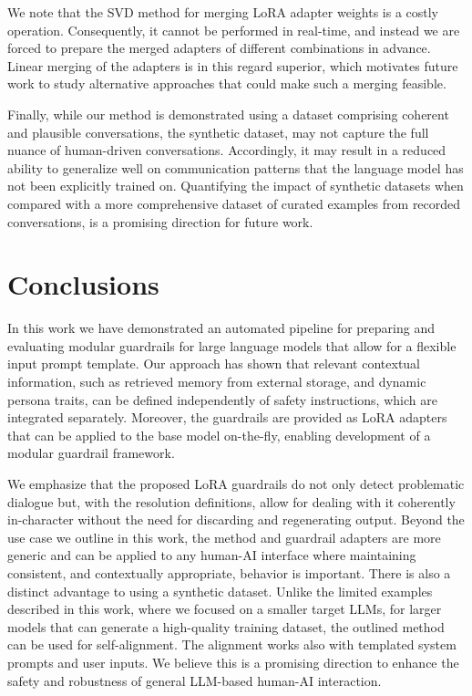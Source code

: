 \documentclass[letterpaper]{article}
\begin{document}
We note that the SVD method for merging LoRA adapter weights is a costly operation. Consequently, it cannot be performed in real-time, and instead we are forced to prepare the merged adapters of different combinations in advance. Linear merging of the adapters is in this regard superior, which motivates future work to study alternative approaches that could make such a merging feasible. 

Finally, while our method is demonstrated using a dataset comprising coherent and plausible conversations, 
the synthetic dataset, may not capture the full nuance of human-driven conversations. Accordingly, it may result in a reduced ability to generalize well on communication patterns that the language model has not been explicitly trained on. 
Quantifying the impact of synthetic datasets when compared with a more comprehensive dataset of curated examples from recorded conversations, is a promising direction for future work. 

\section{Conclusions}
In this work we have demonstrated an automated pipeline for preparing and evaluating modular guardrails for large language models that allow for a flexible input prompt template. Our approach has shown that relevant contextual information, such as retrieved memory from external storage, and dynamic persona traits, can be defined independently of safety instructions, which are integrated separately.
Moreover, the guardrails are provided as LoRA adapters that can be applied to the base model on-the-fly, enabling development of a modular guardrail framework.

We emphasize that the proposed LoRA guardrails do not only detect problematic dialogue but, with the resolution definitions, allow for dealing with it coherently in-character without the need for discarding and regenerating output.
Beyond the use case we outline in this work, the method and guardrail adapters are more generic and can be applied to any human-AI interface where maintaining consistent, and contextually appropriate, behavior is important.  
There is also a distinct advantage to using a synthetic dataset. Unlike the limited examples described in this work, where we focused on a smaller target LLMs, for larger models that can generate a high-quality training dataset, the outlined method can be used for self-alignment. 
The alignment works also with templated system prompts and user inputs. We believe this is a promising direction to enhance the safety and robustness of general LLM-based human-AI interaction. 
\footnotesize


\end{document}
